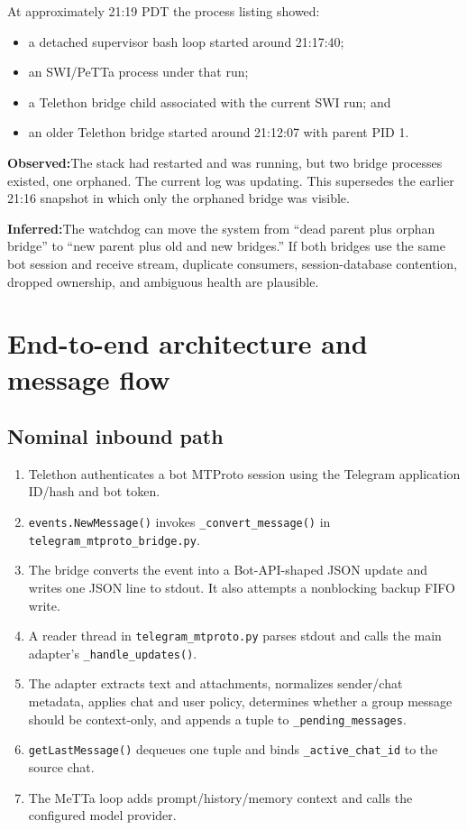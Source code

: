 \documentclass[10pt]{article}
\newcommand{\code}[1]{\texttt{#1}}
\newcommand{\observed}{\textbf{Observed:}}
\newcommand{\inferred}{\textbf{Inferred:}}
\begin{document}
At approximately 21:19 PDT the process listing showed:
\begin{itemize}
  \item a detached supervisor bash loop started around 21:17:40;
  \item an SWI/PeTTa process under that run;
  \item a Telethon bridge child associated with the current SWI run; and
  \item an older Telethon bridge started around 21:12:07 with parent PID 1.
\end{itemize}

\observed The stack had restarted and was running, but two bridge processes existed, one orphaned. The current log was updating. This supersedes the earlier 21:16 snapshot in which only the orphaned bridge was visible.

\inferred The watchdog can move the system from ``dead parent plus orphan bridge'' to ``new parent plus old and new bridges.'' If both bridges use the same bot session and receive stream, duplicate consumers, session-database contention, dropped ownership, and ambiguous health are plausible.

\section{End-to-end architecture and message flow}

\subsection{Nominal inbound path}

\begin{enumerate}
  \item Telethon authenticates a bot MTProto session using the Telegram application ID/hash and bot token.
  \item \code{events.NewMessage()} invokes \code{\_convert\_message()} in \code{telegram\_mtproto\_bridge.py}.
  \item The bridge converts the event into a Bot-API-shaped JSON update and writes one JSON line to stdout. It also attempts a nonblocking backup FIFO write.
  \item A reader thread in \code{telegram\_mtproto.py} parses stdout and calls the main adapter's \code{\_handle\_updates()}.
  \item The adapter extracts text and attachments, normalizes sender/chat metadata, applies chat and user policy, determines whether a group message should be context-only, and appends a tuple to \code{\_pending\_messages}.
  \item \code{getLastMessage()} dequeues one tuple and binds \code{\_active\_chat\_id} to the source chat.
  \item The MeTTa loop adds prompt/history/memory context and calls the configured model provider.
\end{enumerate}
\end{document}

